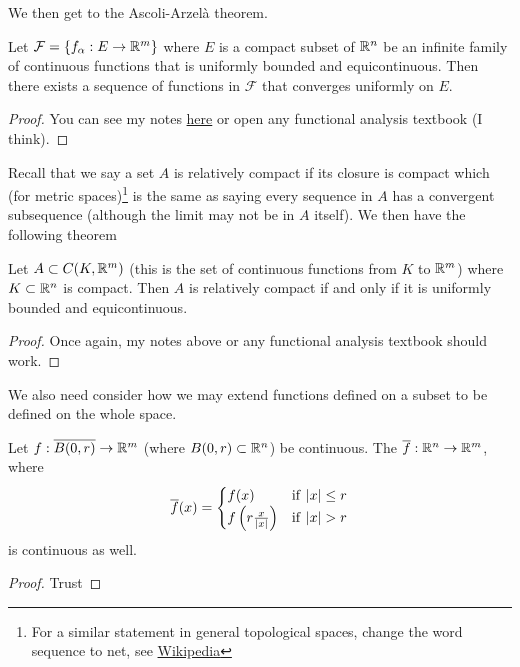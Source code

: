 We then get to the Ascoli-Arzelà theorem.
\begin{theorem}\label{thm:ascoli}
    Let $\mathcal{F} = \{f_\alpha: E \to \mathbb{R}^m\}$ where $E$ is a compact subset of $\mathbb{R}^n$ be an infinite family of continuous functions that is uniformly bounded and equicontinuous. Then there exists a sequence of functions in $\mathcal{F}$ that converges uniformly on $E$.
\end{theorem}
\begin{proof}
You can see my notes \href{http://individual.utoronto.ca/rishibhp/notes/ascoli_arzela_thm.pdf}{here} or open any functional analysis textbook (I think).
\end{proof}

Recall that we say a set $A$ is relatively compact if its closure is compact which (for metric spaces)\footnote{For a similar statement in general topological spaces, change the word sequence to net, see \href{https://en.wikipedia.org/wiki/Net_(mathematics)}{Wikipedia}} is the same as saying every sequence in $A$ has a convergent subsequence (although the limit may not be in $A$ itself). We then have the following theorem
\begin{theorem}\label{thm:rel-compact-equiv}
    Let $A \subset C(K, \mathbb{R}^m)$ (this is the set of continuous functions from $K$ to $\mathbb{R}^m$) where $K \subset \mathbb{R}^n$ is compact. Then $A$ is relatively compact if and only if it is uniformly bounded and equicontinuous.
\end{theorem}
\begin{proof}
Once again, my notes above or any functional analysis textbook should work.
\end{proof}

We also need consider how we may extend functions defined on a subset to be defined on the whole space.
\begin{theorem}\label{thm:cont-ext}
    Let $f: \overline{B(0, r)} \to \mathbb{R}^m$ (where $B(0, r) \subset \mathbb{R}^n$) be continuous. The $\overline{f}: \mathbb{R}^n \to \mathbb{R}^m$, where
    \begin{align*}
        \overline{f}(x) = 
        \begin{cases}
            f(x) & \mathrm{if } \ |x| \leq r\\
            f\left(r \frac{x}{|x|}\right) &\mathrm{if } \ |x| > r
        \end{cases}
    \end{align*}
    is continuous as well.
\end{theorem}
\begin{proof}
Trust
\end{proof}

